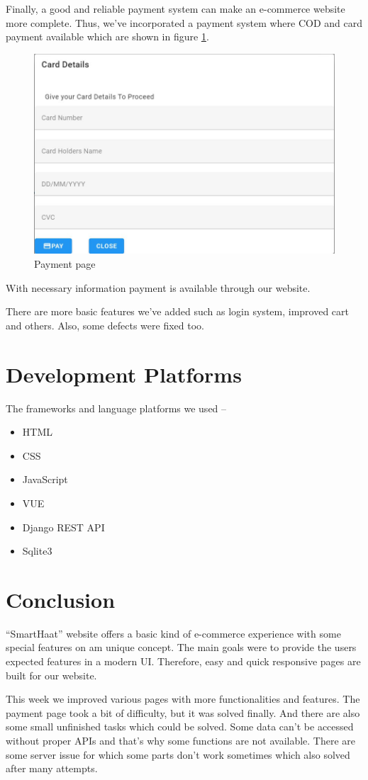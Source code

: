 \documentclass[a4paper,12pt]{report}
\begin{document}
Finally, a good and reliable payment system can make an e-commerce website more complete. Thus, we've incorporated a payment system where COD and card payment available which are shown in figure \ref{pmnt}.
\begin{figure}[H]
\centering
\includegraphics[keepaspectratio, width=12cm]{payment.jpg}
\caption{Payment page}
\label{pmnt}
\end{figure}

With necessary information payment is available through our website.

There are more basic features we've added such as login system, improved cart and others. Also, some defects were fixed too.





\section*{Development Platforms}
The frameworks and language platforms we used --
\begin{itemize}
	\item HTML
	\item CSS
\item JavaScript
	\item VUE
\item Django REST API
\item Sqlite3
\end{itemize}

\section*{Conclusion}
``SmartHaat'' website offers a basic kind of e-commerce experience with some special features on am unique concept. The main goals were to provide the users expected features in a modern UI. Therefore, easy and quick responsive pages are built for our website.

This week we improved various pages with more functionalities and features. The payment page took a bit of difficulty, but it was solved finally. And there are also some small unfinished tasks which could be solved. Some data can't be accessed without proper APIs and that's why some functions are not available.
There are some server issue for which some parts don't work sometimes which also solved after many attempts.
\end{document}
